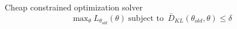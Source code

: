 \documentclass{beamer}
\begin{document}
    
    

\begin{frame}{Cheap constrained optimization solver}
\begingroup 
\Large
\begin{equation*}
    \text{max}_{\theta} \hspace{3pt} L_{\theta_{old}}(\theta) \hspace{3pt} 
    \text{subject to }  \hspace{2pt} \bar{D}_{KL}\left(\theta_{old}, \theta \right) \leq \delta
\end{equation*}
\endgroup

\end{frame}
\end{document}
